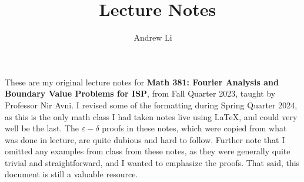 \documentclass[b5paper]{article}
\numberwithin{equation}{section}
\numberwithin{lemmacounter}{section}
\numberwithin{definitioncounter}{section}
\begin{document}
    
    \pagestyle{fancy}
    \fancyfoot[C]{}
    \fancyfoot[L]{\courseshort \: \coursetitle}
    \fancyfoot[R]{\thepage}

    \title{\textbf{\textsf{\courseshort \, Lecture Notes}}}
    \author{Andrew Li}
    \date{\term}
    \clearpage\maketitle
    \noindent These are my original lecture notes for \textbf{Math 381: Fourier Analysis and Boundary Value Problems for ISP}, from Fall Quarter 2023, taught by Professor Nir Avni. I revised some of the formatting during Spring Quarter 2024, as this is the only math class I had taken notes live using \LaTeX, and could very well be the last. The $\varepsilon-\delta$ proofs in these notes, which were copied from what was done in lecture, are quite dubious and hard to follow. Further note that I omitted any examples from class from these notes, as they were generally quite trivial and straightforward, and I wanted to emphasize the proofs. That said, this document is still a valuable resource.
    \thispagestyle{empty}

    \tableofcontents
    
    
    
    
    
    
    
    
    
    
    
    
    
    
    
    
    
    
    
    
    
    
    
    
    
    
\end{document}
